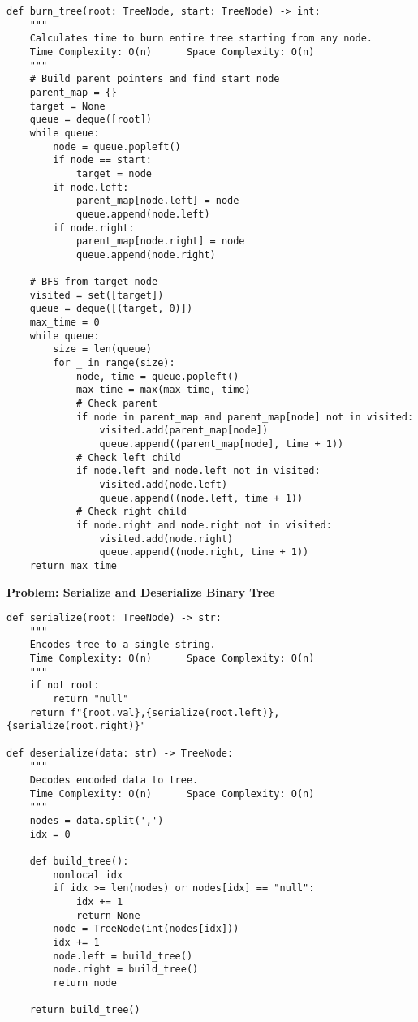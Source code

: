 \begin{verbatim}
def burn_tree(root: TreeNode, start: TreeNode) -> int:
    """
    Calculates time to burn entire tree starting from any node.
    Time Complexity: O(n)      Space Complexity: O(n)
    """
    # Build parent pointers and find start node
    parent_map = {}
    target = None
    queue = deque([root])
    while queue:
        node = queue.popleft()
        if node == start:
            target = node
        if node.left:
            parent_map[node.left] = node
            queue.append(node.left)
        if node.right:
            parent_map[node.right] = node
            queue.append(node.right)
    
    # BFS from target node
    visited = set([target])
    queue = deque([(target, 0)])
    max_time = 0
    while queue:
        size = len(queue)
        for _ in range(size):
            node, time = queue.popleft()
            max_time = max(max_time, time)
            # Check parent
            if node in parent_map and parent_map[node] not in visited:
                visited.add(parent_map[node])
                queue.append((parent_map[node], time + 1))
            # Check left child
            if node.left and node.left not in visited:
                visited.add(node.left)
                queue.append((node.left, time + 1))
            # Check right child
            if node.right and node.right not in visited:
                visited.add(node.right)
                queue.append((node.right, time + 1))
    return max_time
\end{verbatim}
\noindent\textbf{Problem: Serialize and Deserialize Binary Tree}
\begin{verbatim}
def serialize(root: TreeNode) -> str:
    """
    Encodes tree to a single string.
    Time Complexity: O(n)      Space Complexity: O(n)
    """
    if not root:
        return "null"
    return f"{root.val},{serialize(root.left)},{serialize(root.right)}"

def deserialize(data: str) -> TreeNode:
    """
    Decodes encoded data to tree.
    Time Complexity: O(n)      Space Complexity: O(n)
    """
    nodes = data.split(',')
    idx = 0
    
    def build_tree():
        nonlocal idx
        if idx >= len(nodes) or nodes[idx] == "null":
            idx += 1
            return None
        node = TreeNode(int(nodes[idx]))
        idx += 1
        node.left = build_tree()
        node.right = build_tree()
        return node
    
    return build_tree()
\end{verbatim}
